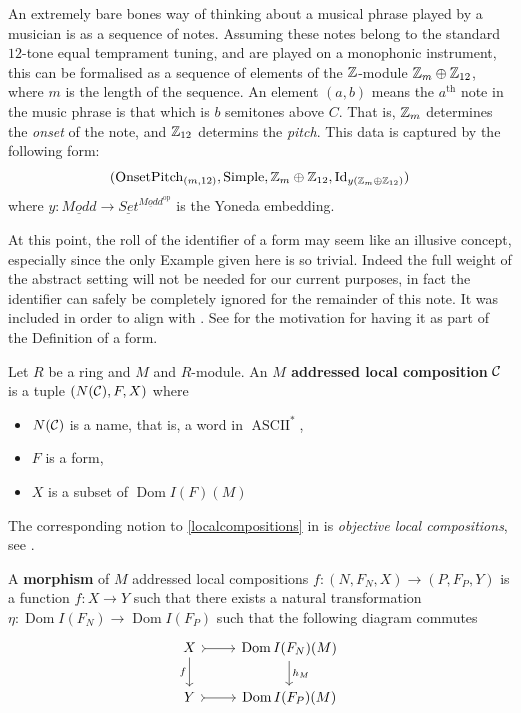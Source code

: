 \begin{example}
\label{OnsetPitch}
 An extremely bare bones way of thinking about a musical phrase played by a musician is as a sequence of notes. Assuming these notes belong to the standard $12$-tone equal temprament tuning, and are played on a monophonic instrument, this can be formalised as a sequence of elements of the $\mathbb{Z}$-module $\mathbb{Z}_m \oplus \mathbb{Z}_{12}$, where $m$ is the length of the sequence. An element $(a,b)$ means the $a^\text{th}$ note in the music phrase is that which is $b$ semitones above $C$. That is, $\mathbb{Z}_m$ determines the \emph{onset} of the note, and $\mathbb{Z}_{12}$ determins the \emph{pitch}. This data is captured by the following form:
 \[(\operatorname{OnsetPitch}_{(m,12)},\operatorname{Simple}, \mathbb{Z}_m\oplus\mathbb{Z}_{12},\operatorname{Id}_{y(\mathbb{Z}_m\oplus\mathbb{Z}_{12})})\]
 where $y: \underline{Modd} \to \underline{Set}^{\underline{Modd}^{\text{op}}}$ is the Yoneda embedding.
\end{example}
\begin{remark}
 At this point, the roll of the identifier of a form may seem like an illusive concept, especially since the only Example given here is so trivial. Indeed the full weight of the abstract setting will not be needed for our current purposes, in fact the identifier can safely be completely ignored for the remainder of this note. It was included in order to align with \cite{Mazzola}. See \cite[p.56]{Mazzola} for the motivation for having it as part of the Definition of a form.
\end{remark}
\begin{defn}
 Let $R$ be a ring
 \label{localcompositions}and $M$ and $R$-module. An \textbf{$M$ addressed local composition} $\mathcal{C}$ is a tuple $(N(\mathcal{C}), F,X)$ where
 \begin{itemize}
  \item $N(\mathcal{C})$ is a name, that is, a word in $\operatorname{ASCII}^\ast$,
  \item $F$ is a form,
  \item $X$ is a subset of $\operatorname{Dom}I(F)(M)$
 \end{itemize}
\end{defn}
\begin{remark}
 The corresponding notion to \ref{localcompositions} in \cite{Mazzola} is \emph{objective local compositions}, see \cite[\S7, p90]{Mazzola}.
\end{remark}
\begin{defn}
 A \textbf{morphism} of $M$ addressed local compositions $f:(N,F_N,X)\to (P,F_P,Y)$ is a function $f: X \to Y$ such that there exists a natural transformation $\eta: \operatorname{Dom}I(F_N) \to \operatorname{Dom}I(F_P)$ such that the following diagram commutes
 \[
  \begin{tikzcd}
   X\arrow[r,rightarrowtail]\arrow[d,swap,"f"] &\operatorname{Dom}I(F_N)(M)\arrow[d,"{h_M}"]\\
   Y\arrow[r,rightarrowtail]&\operatorname{Dom}I(F_P)(M)
  \end{tikzcd}
 \]
\end{defn}

